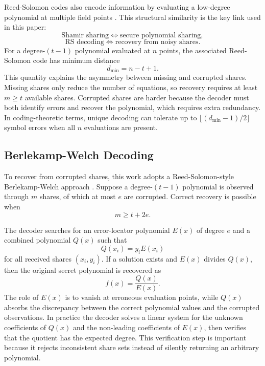 Reed-Solomon codes also encode information by evaluating a low-degree polynomial at multiple field points \cite{reedsolomon1960}. This structural similarity is the key link used in this paper:
\begin{equation}
\text{Shamir sharing} \Longleftrightarrow \text{secure polynomial sharing},
\end{equation}
\begin{equation}
\text{RS decoding} \Longleftrightarrow \text{recovery from noisy shares}.
\end{equation}
For a degree-$(t-1)$ polynomial evaluated at $n$ points, the associated Reed-Solomon code has minimum distance
\begin{equation}
d_{\min} = n - t + 1.
\label{eq:distance}
\end{equation}
This quantity explains the asymmetry between missing and corrupted shares. Missing shares only reduce the number of equations, so recovery requires at least $m \geq t$ available shares. Corrupted shares are harder because the decoder must both identify errors and recover the polynomial, which requires extra redundancy. In coding-theoretic terms, unique decoding can tolerate up to $\lfloor (d_{\min}-1)/2 \rfloor$ symbol errors when all $n$ evaluations are present.

\subsection{Berlekamp-Welch Decoding}

To recover from corrupted shares, this work adopts a Reed-Solomon-style Berlekamp-Welch approach \cite{fedorenko2005}. Suppose a degree-$(t-1)$ polynomial is observed through $m$ shares, of which at most $e$ are corrupted. Correct recovery is possible when
\begin{equation}
m \geq t + 2e.
\label{eq:bound}
\end{equation}

The decoder searches for an error-locator polynomial $E(x)$ of degree $e$ and a combined polynomial $Q(x)$ such that
\begin{equation}
Q(x_{i}) = y_{i}E(x_{i})
\label{eq:bw_constraint}
\end{equation}
for all received shares $(x_{i}, y_{i})$. If a solution exists and $E(x)$ divides $Q(x)$, then the original secret polynomial is recovered as
\begin{equation}
f(x) = \frac{Q(x)}{E(x)}.
\label{eq:quotient}
\end{equation}
The role of $E(x)$ is to vanish at erroneous evaluation points, while $Q(x)$ absorbs the discrepancy between the correct polynomial values and the corrupted observations. In practice the decoder solves a linear system for the unknown coefficients of $Q(x)$ and the non-leading coefficients of $E(x)$, then verifies that the quotient has the expected degree. This verification step is important because it rejects inconsistent share sets instead of silently returning an arbitrary polynomial.

